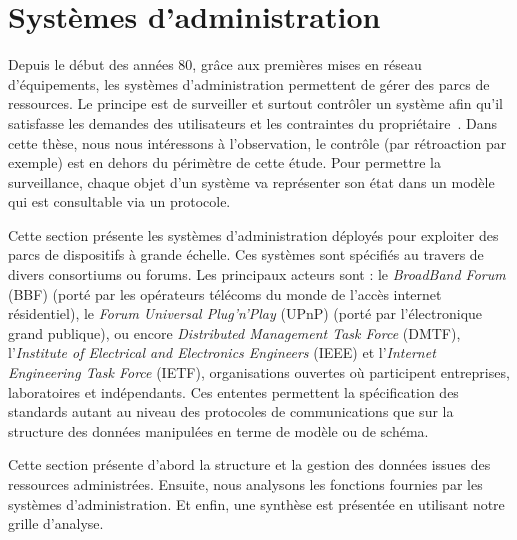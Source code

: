\section{Systèmes d'administration}\label{sec:rw:supervision:administration}
Depuis le début des années 80, grâce aux premières mises en réseau d'équipements, les systèmes d'administration permettent de gérer des parcs de ressources. Le principe est de surveiller et surtout contrôler un système afin qu'il satisfasse les demandes des utilisateurs et les contraintes du propriétaire~\cite{Sloman:management}. Dans cette thèse, nous nous intéressons à l'observation, le contrôle (par rétroaction par exemple) est en dehors du périmètre de cette étude. Pour permettre la surveillance, chaque objet d'un système va représenter son état dans un modèle qui est consultable via un protocole.

Cette section présente les systèmes d'administration déployés pour exploiter des parcs de dispositifs à grande échelle. Ces systèmes sont spécifiés au travers de divers consortiums ou forums. Les principaux acteurs sont : le \textit{BroadBand Forum} (BBF) (porté par les opérateurs télécoms du monde de l'accès internet résidentiel), le \textit{Forum Universal Plug'n'Play} (UPnP) (porté par l'électronique grand publique), ou encore \textit{Distributed Management Task Force} (DMTF), l'\textit{Institute of Electrical and Electronics Engineers} (IEEE) et l'\textit{Internet Engineering Task Force} (IETF), organisations ouvertes où participent entreprises, laboratoires et indépendants. Ces ententes permettent la spécification des standards autant au niveau des protocoles de communications que sur la structure des données manipulées en terme de modèle ou de schéma.

Cette section présente d'abord la structure et la gestion des données issues des ressources administrées. Ensuite, nous analysons les fonctions fournies par les systèmes d'administration. Et enfin, une synthèse est présentée en utilisant notre grille d'analyse.
